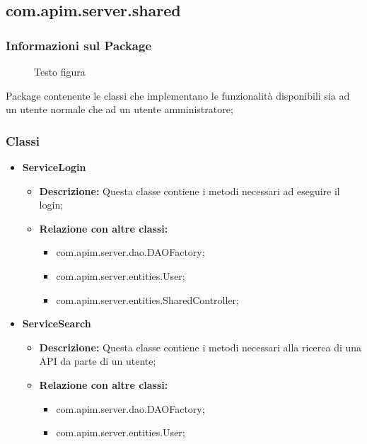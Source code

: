{{{       \subsection{com.apim.server.shared}{
    \subsubsection{Informazioni sul Package}
        \begin{figure}[ht]
          \centering
          \caption{Testo figura}
          \label{Testo figura}
        \end{figure}
        Package  contenente le classi che implementano le funzionalità disponibili sia ad un utente normale che ad un utente amministratore;
        \subsubsection{Classi}
        \begin{itemize} \itemsep1pt
          \item \textbf{ServiceLogin}
          \begin{itemize}
            \item \textbf{Descrizione:} Questa classe contiene i metodi necessari ad eseguire il login;
            \item \textbf{Relazione con altre classi:}
            \begin{itemize}
              \item com.apim.server.dao.DAOFactory;
              \item com.apim.server.entities.User;
              \item com.apim.server.entities.SharedController;
            \end{itemize}
          \end{itemize}
          \item \textbf{ServiceSearch}
          \begin{itemize}
            \item \textbf{Descrizione:} Questa classe contiene i metodi necessari alla ricerca di una API da parte di un utente;
            \item \textbf{Relazione con altre classi:}
            \begin{itemize}
              \item com.apim.server.dao.DAOFactory;
              \item com.apim.server.entities.User;

\end{itemize}
\end{itemize}
\end{itemize}}}}}
